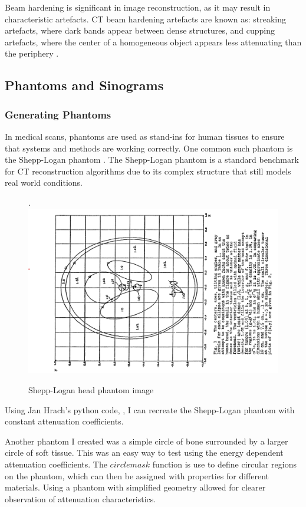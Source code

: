 \documentclass{article}
\begin{document}
Beam hardening is significant in image reconstruction, as it may result in characteristic artefacts. CT beam hardening artefacts are known as: streaking artefacts, where dark bands appear between dense structures, and cupping artefacts, where the center of a homogeneous object appears less attenuating than the periphery \cite{Murphy_2016}.

\subsection{Phantoms and Sinograms}
\subsubsection{Generating Phantoms}
In medical scans, phantoms are used as stand-ins for human tissues to ensure that systems and methods are working correctly. One common such phantom is the Shepp-Logan phantom \cite{Shepp_Logan_1974}. The Shepp-Logan phantom is a standard benchmark for CT reconstruction algorithms due to its complex structure that still models real world conditions.

\begin{figure}.
	\includegraphics[width=\linewidth]{shepplogan.png}
	\caption{Shepp-Logan head phantom image}
	\label{fig:shepplogan}
\end{figure}

Using Jan Hrach's python code, \cite{phantom_py}, I can recreate the Shepp-Logan phantom with constant attenuation coefficients.

Another phantom I created was a simple circle of bone surrounded by a larger circle of soft tissue. This was an easy way to test using the energy dependent attenuation coefficients. The $circlemask$ function is use to define circular regions on the phantom, which can then be assigned with properties for different materials. Using a phantom with simplified geometry allowed for clearer observation of attenuation characteristics.
\end{document}
